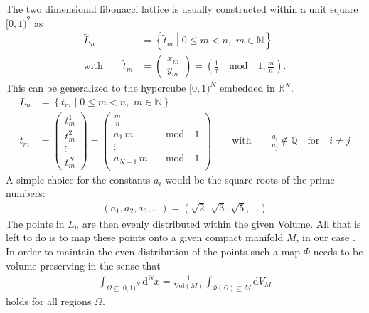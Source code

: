 \noindent The two dimensional fibonacci lattice is usually constructed within a unit square $[0,1)^2$ as
\begin{align*}
 \tilde{L}_n                      & = \left\{ \tilde{t}_m \middle| 0 \le m < n, \, \, m \in \mathbb{N} \right\}                                    \\
 \textrm{with} \qquad \tilde{t}_m & = \begin{pmatrix}x_m\\y_m\end{pmatrix} = \left(\frac{1}{\tau} \quad \mathrm{mod} \quad 1, \frac{m}{n} \right) \textrm{.}
\end{align*}
\noindent This can be generalized to the hypercube $[0,1)^N$ embedded in $\mathbb{R}^N$.
\begin{align*}
 L_n & = \left\{ t_m \middle| 0 \le m < n, \, \, m \in \mathbb{N} \right\}                                                                                       \\
 t_m & = \begin{pmatrix} t_m^1 \\ t_m^2 \\ \vdots \\ t_m^N \end{pmatrix} = \begin{pmatrix}
  \frac{m}{n}        &                      \\
  a_1 \, m \quad     & \mathrm{mod} \quad 1 \\
  \vdots             &                      \\
  a_{N-1} \, m \quad & \mathrm{mod} \quad 1 \\
 \end{pmatrix} \qquad \textrm{with} \qquad \frac{a_i}{a_j} \notin \mathbb{Q} \quad \textrm{for} \quad i \neq j
\end{align*}
A simple choice for the constants $a_i$ would be the square roots of the prime numbers:
\begin{align*}
 (a_1, a_2 ,a_3, \dots) = (\sqrt{2}, \sqrt{3}, \sqrt{5}, \dots)
\end{align*}
The points in $L_n$ are then evenly distributed within the given Volume. All that is left to do is to map these points onto a given compact manifold $M$, in our case \SUTwo. In order to maintain the even distribution of the points such a map $\Phi$ needs to be volume preserving in the sense that
\begin{align}
 \int_{\Omega \subseteq [0,1)^N} \mathrm{d}^N x = \frac{1}{\mathrm{Vol}(M)} \int_{\Phi(\Omega) \subseteq M} \mathrm{d}V_M
 \label{eq:fibAreaPres}
\end{align}
holds for all regions $\Omega$.

